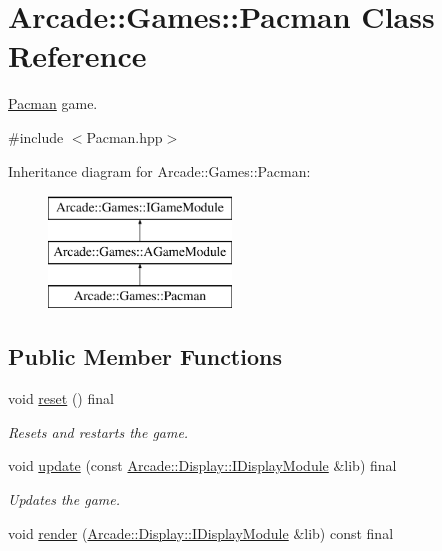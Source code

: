 \hypertarget{classArcade_1_1Games_1_1Pacman}{}\section{Arcade\+::Games\+::Pacman Class Reference}
\label{classArcade_1_1Games_1_1Pacman}


\mbox{\hyperlink{classArcade_1_1Games_1_1Pacman}{Pacman}} game.  




{\ttfamily \#include $<$Pacman.\+hpp$>$}

Inheritance diagram for Arcade\+::Games\+::Pacman\+:\begin{figure}[H]
\begin{center}
\leavevmode
\includegraphics[height=3.000000cm]{classArcade_1_1Games_1_1Pacman}
\end{center}
\end{figure}
\subsection*{Public Member Functions}
\begin{DoxyCompactItemize}
\item 
\mbox{\label{classArcade_1_1Games_1_1Pacman_ab22a7f3125e07169dc326eb3b89dba94}} 
void \mbox{\hyperlink{classArcade_1_1Games_1_1Pacman_ab22a7f3125e07169dc326eb3b89dba94}{reset}} () final
\begin{DoxyCompactList}\small\item\em Resets and restarts the game. \end{DoxyCompactList}\item 
void \mbox{\hyperlink{classArcade_1_1Games_1_1Pacman_aa6bc227c3f14cc8d66d11f2d32bed3ec}{update}} (const \mbox{\hyperlink{classArcade_1_1Display_1_1IDisplayModule}{Arcade\+::\+Display\+::\+I\+Display\+Module}} \&lib) final
\begin{DoxyCompactList}\small\item\em Updates the game. \end{DoxyCompactList}\item 
void \mbox{\hyperlink{classArcade_1_1Games_1_1Pacman_ab1a7408f265efbef12b4f9d1a6fb4512}{render}} (\mbox{\hyperlink{classArcade_1_1Display_1_1IDisplayModule}{Arcade\+::\+Display\+::\+I\+Display\+Module}} \&lib) const final
\end{DoxyCompactItemize}
